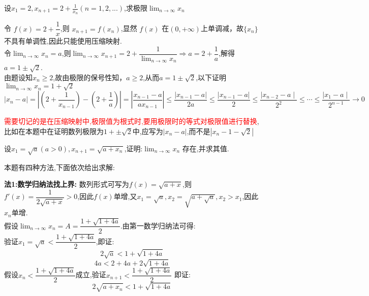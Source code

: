\documentclass[8pt a4paper, oneside, UTF8]{ctexbook}
\begin{document}
\begin{sloppypar}
\begin{note}
\begin{solution}
        \end{solution}
    \end{note}
    \begin{problem}
        设$x_1=2,x_{n+1}=2+\frac1{x_n}(n=1,2,...)$,求极限$\lim_{n\to\infty}x_n$
    \end{problem}
    \begin{solution}
        令 $f(x)=2+\dfrac1x$,则 $x_{n+1}=f(x_n)$,显然 $f(x)$ 在$(0,+\infty)$上单调减，故$\{x_n\}$不具有单调性,因此只能使用压缩映射.\\
        令$\lim_{n\to \infty}x_n=a$,则$\lim_{n \to \infty}x_{n+1}=2+\dfrac{1}{\lim_{n\to \infty}x_n} \Rightarrow a=2+\dfrac{1}{a}$,解得$a=1\pm \sqrt{2}$.\\
        由题设知$x_n\geq2$,故由极限的保号性知，$a\geq2$,从而$a=1 \pm \sqrt{2}$,以下证明$\lim_{n\to \infty}x_n=1+\sqrt{2}$\\
        $\mid x_n-a\mid=\left|\left(2+\dfrac{1}{x_{n-1}}\right)-\left(2+\dfrac{1}{a}\right)\right|=\left|\dfrac{x_{n-1}-a}{ax_{n-1}}\right|\leqslant\dfrac{\left|x_{n-1}-a\right|}{2a}\leqslant\dfrac{\left|x_{n-1}-a\right|}{2} \leqslant \dfrac{\mid x_{n-2}-a\mid}{2^2} \leqslant \cdots \leqslant \dfrac{\mid x_1-a\mid}{2^{n-1}}\to0$
    \end{solution}
    \begin{note}
        \textcolor{red}{需要切记的是在压缩映射中,极限值为根式时,要用极限时的等式对极限值进行替换},比如在本题中在证明数列极限为$1+\pm \sqrt{2}$中,应写为$|x_n -a|$,而不是$|x_n -1 -\sqrt{2}|$
    \end{note}
    \begin{problem}
        设$x_1=\sqrt{a}(a>0),x_{n+1}=\sqrt{a+x_n}$,证明:$\lim_{n\to\infty} x_n$ 存在,并求其值.
    \end{problem}
        本题有四种方法,下面依次给出求解:
        \begin{solution}{\textbf{法1:数学归纳法找上界:}}
            数列形式可写为$f(x)=\sqrt{a+x}$,则$f'(x)=\dfrac{1}{2\sqrt{a+x}}>0$,因此$f(x)$单增,又$x_1=\sqrt{a},x_2=\sqrt{a+\sqrt{a}},x_2>x_1$,因此$x_n$单增.\\
            假设$\lim_{n\to \infty}x_n=A=\dfrac{1+\sqrt{1+4a}}{2}$.由第一数学归纳法可得:\\
            验证$x_1=\sqrt{a}<\dfrac{1+\sqrt{1+4a}}{2}$,即证:$$
                2\sqrt{a}<1+\sqrt{1+4a}
            $$
            $$
                4a<2+4a+2\sqrt{1+4a}
            $$
            假设$x_n<\dfrac{1+\sqrt{1+4a}}{2}$成立,验证$x_{n+1}<\dfrac{1+\sqrt{1+4a}}{2}$
            即证:$$
                2\sqrt{a+x_n}<1+\sqrt{1+4a}
$$
\end{solution}
\end{sloppypar}
\end{document}

